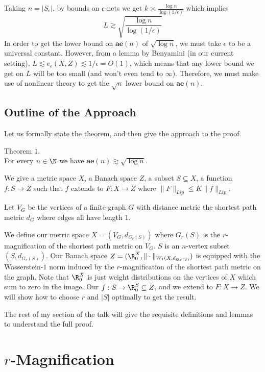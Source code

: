 Taking $n = |S_{\epsilon}|$, by bounds on $\epsilon$-nets we get $k \asymp \frac{\log n}{\log(1/\epsilon)}$ which implies
\[
L \gtrsim \sqrt{\frac{\log n}{\log (1/\epsilon)}}
\]
In order to get the lower bound on $\textbf{ae}(n)$ of $\sqrt{\log n}$, we must take $\epsilon$ to be a universal constant.
However, from a lemma by Benyamini (in our current setting), $L \lesssim e_{\epsilon}(X, Z) \lesssim 1/\epsilon = O(1)$, which means that any lower bound we get on $L$ will be too small (and won't even tend to $\infty$). Therefore, we must make use of nonlinear theory to get the $\sqrt{n}$ lower bound on $\textbf{ae}(n)$. 

\subsection{Outline of the Approach}

Let us formally state the theorem, and then give the approach to the proof. 
\begin{thm} Theorem $1$. \\
For every $n \in \N$ we have $\textbf{ae}(n) \gtrsim \sqrt{\log n}$. 
\end{thm}

We give a metric space $X$, a Banach space $Z$, a subset $S \subseteq X$, a function $f:S \to Z$ such that $f$ extends to $F: X \to Z$ where $\|F\|_{Lip} \leq K\|f\|_{Lip}$. 

Let $V_G$ be the vertices of a finite graph $G$ with distance metric the shortest path metric $d_G$ where edges all have length $1$. 

We define our metric space $X = (V_G, d_{G_r(S)})$ where $G_r(S)$ is the $r$-magnification of the shortest path metric on $V_G$. $S$ is an $n$-vertex subset $(S, d_{G_r(S)})$. 
Our Banach space $Z = (\R_0^{X}, \|\cdot\|_{W_1(X, d_{G_r(S)}})$ is equipped with the Wasserstein-$1$ norm induced by the $r$-magnification of the shortest path metric on the graph. Note that $\R_0^{X}$ is just weight distributions on the vertices of $X$ which sum to zero in the image. Our $f: S \to \R_0^{S} \subseteq Z$, and we extend to $F: X \to Z$. We will show how to choose $r$ and $|S|$ optimally to get the result. 

The rest of my section of the talk will give the requisite definitions and lemmas to understand the full proof. 

\section{$r$-Magnification}

